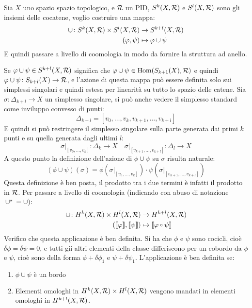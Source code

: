 Sia $ X $ uno spazio spazio topologico, e $ \mathcal{R} $ un PID,
$ S^k(X, \mathcal{R}) $ e $ S^l(X, \mathcal{R}) $ sono gli insiemi delle cocatene,
voglio costruire una mappa:
\begin{align*}
  \cup \colon S^k(X, \mathcal{R}) \times S^l(X, \mathcal{R}) & \to S^{k+l}(X, \mathcal{R}) \\
  (\varphi, \psi) & \mapsto \varphi \cup \psi
\end{align*}
E quindi passare a livello di coomologia in modo da fornire la struttura
ad anello.

Se $ \varphi \cup \psi \in S^{k+l}(X, \mathcal{R}) $ significa che $ \varphi \cup \psi \in \mathrm{Hom}( S_{k+1}(X), \mathcal{R}) $
e quindi $ \varphi \cup \psi \colon S_{k+l}(X) \to \mathcal{R} $, e l'azione di questa mappa può essere
definita solo sui simplessi singolari e quindi estesa per linearità su tutto
lo spazio delle catene. Sia $ \sigma \colon \Delta_{k+l} \to X $ un simplesso singolare, si
può anche vedere il simplesso standard come inviluppo convesso di punti:
\[
  \Delta_{k+l} = [v_0, \dots, v_k, v_{k+1}, \dots, v_{k+l}]
\]
E quindi si può restringere il simplesso singolare sulla parte generata
dai primi $ k $ punti e su quella generata dagli ultimi $ l $:
\[
  \sigma \lvert_{[v_0, \dots, v_k]} \colon \Delta_k \to X \quad \sigma \lvert_{[v_{k+1}, \dots, v_{k+l}]} \colon \Delta_l \to X
\]
A questo punto la definizione dell'azione di $ \phi \cup \psi $ su $ \sigma $ risulta naturale:
\[
  (\phi \cup \psi)(\sigma) = \phi \left(\sigma \lvert_{[v_0, \dots, v_k]} \right) \cdot \psi \left(\sigma \lvert_{[v_{k+1}, \dots, v_{k+l}]}\right)
\]
Questa definizione è ben posta, il prodotto tra i due termini è infatti il prodotto in $ \mathcal{R} $.
Per passare a livello di coomologia (indicando con abuso di notazione $ \cup^\star = \cup $):
\begin{align*}
  \cup \colon H^k(X, \R) \times H^l(X, \R) & \to H^{k+l}(X, \R) \\
  (\llbracket \phi \rrbracket, \llbracket \psi \rrbracket) & \mapsto \llbracket \phi \circ \psi \rrbracket
\end{align*}
Verifico che questa applicazione è ben definita. Si ha che $ \phi $ e $ \psi $ sono
cocicli, cioè $ \delta \phi = \delta \psi = 0 $, e tutti gii altri elementi della classe differiscono
per un cobordo da $ \phi $ e $ \psi $, cioè sono della forma $ \phi + \delta\phi_1 $ e $ \psi + \delta\psi_1 $.
L'applicazione è ben definita se:
\begin{enumerate}
\item $ \phi \cup \psi $ è un bordo
\item Elementi omologhi in $ H^k(X, \mathcal{R}) \times H^l(X, \mathcal{R}) $ vengono
  mandati in elementi omologhi in $ H^{k+l}(X, \mathcal{R}) $.
\end{enumerate}
